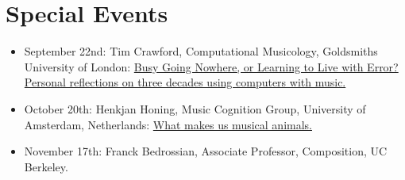 \documentclass[11pt]{amsart}
\begin{document}
\section{Special Events}
\begin{itemize}

\item September 22nd: Tim Crawford, Computational Musicology, Goldsmiths University of London: \href{http://www.cirmmt.org/activities/distinguished-lectures/Tim_Crawford}{Busy Going Nowhere, or Learning to Live with Error? Personal reflections on three decades using computers with music.}
\item October 20th: Henkjan Honing, Music Cognition Group, University of Amsterdam, Netherlands: \href{http://www.cirmmt.org/activities/distinguished-lectures/copy_of_vorlander}{What makes us musical animals.}
\item November 17th: Franck Bedrossian, Associate Professor, Composition, UC Berkeley.


\end{itemize}
\end{document}
